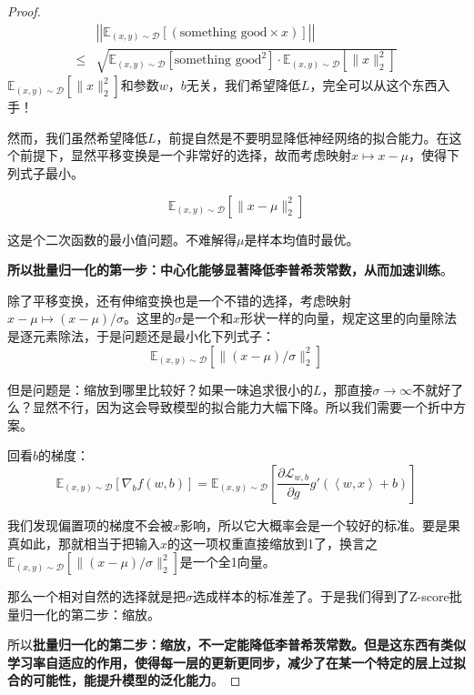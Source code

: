 \begin{proof}
    \begin{align}
        & \left|\left|\mathbb{E}_{(x,y) \sim \mathcal{D}}\left[(\text{something good} \times x)\right]\right|\right| \\
        \leqslant & \sqrt{\mathbb{E}_{(x,y) \sim \mathcal{D}}[\text{something good}^2] \cdot \mathbb{E}_{(x,y) \sim \mathcal{D}}[\|x\|_2^2]}
    \end{align}
    $\mathbb{E}_{(x,y) \sim \mathcal{D}}[\|x\|_2^2]$和参数$w$，$b$无关，我们希望降低$L$，完全可以从这个东西入手！

    然而，我们虽然希望降低$L$，前提自然是不要明显降低神经网络的拟合能力。在这个前提下，显然平移变换是一个非常好的选择，故而考虑映射$x \mapsto x - \mu$，使得下列式子最小。

    \begin{equation}
        \mathbb{E}_{(x,y) \sim \mathcal{D}}[\|x - \mu\|_2^2]
    \end{equation}

    这是个二次函数的最小值问题。不难解得$\mu$是样本均值时最优。

    \textbf{所以批量归一化的第一步：中心化能够显著降低李普希茨常数，从而加速训练}。

    除了平移变换，还有伸缩变换也是一个不错的选择，考虑映射$x-\mu \mapsto (x-\mu) / \sigma$。这里的$\sigma$是一个和$x$形状一样的向量，规定这里的向量除法是逐元素除法，于是问题还是最小化下列式子：
    \begin{equation}
        \mathbb{E}_{(x,y) \sim \mathcal{D}}[\|(x - \mu) / \sigma\|_2^2]
    \end{equation}

    但是问题是：缩放到哪里比较好？如果一味追求很小的$L$，那直接$\sigma \to \infty$不就好了么？显然不行，因为这会导致模型的拟合能力大幅下降。所以我们需要一个折中方案。

    回看$b$的梯度：
    \begin{equation}
        \mathbb{E}_{(x,y) \sim \mathcal{D}}[\nabla_b f(w, b)] = \mathbb{E}_{(x,y) \sim \mathcal{D}}\left[\frac{\partial \mathcal{L}_{w, b}}{\partial g}g'(\left\langle w, x \right\rangle + b)\right]
    \end{equation}

    我们发现偏置项的梯度不会被$x$影响，所以它大概率会是一个较好的标准。要是果真如此，那就相当于把输入$x$的这一项权重直接缩放到1了，换言之$\mathbb{E}_{(x,y) \sim \mathcal{D}}[\|(x - \mu) / \sigma\|_2^2]$是一个全1向量。

    那么一个相对自然的选择就是把$\sigma$选成样本的标准差了。于是我们得到了Z-score批量归一化的第二步：缩放。

    所以\textbf{批量归一化的第二步：缩放，不一定能降低李普希茨常数。但是这东西有类似学习率自适应的作用，使得每一层的更新更同步，减少了在某一个特定的层上过拟合的可能性，能提升模型的泛化能力}。

\end{proof}

